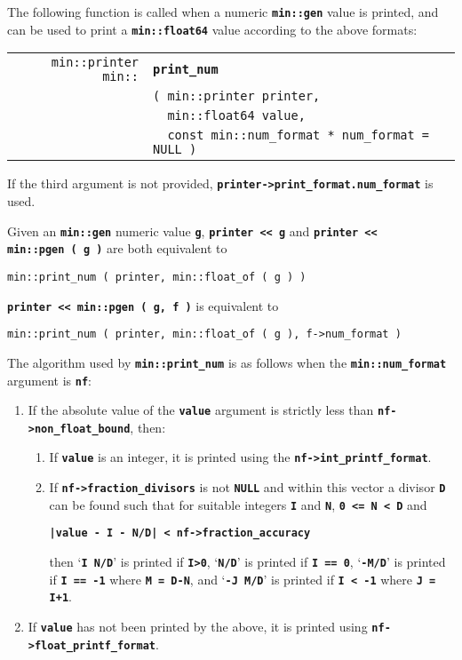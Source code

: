 \documentclass[12pt]{article}
\makeatletter
\newcommand{\TT}[1]{{\tt \bfseries #1}}
\newcommand{\ttindex}[1]{\index{#1@{\tt #1}}}
\newcommand{\EOL}{\penalty \exhyphenpenalty}
\newenvironment{indpar}[1][0.3in]%
	{\begin{list}{}%
		     {\setlength{\itemsep}{0in}%
		      \setlength{\topsep}{0in}%
		      \setlength{\parsep}{1ex}%
		      \setlength{\labelwidth}{#1}%
		      \setlength{\leftmargin}{#1}%
		      \addtolength{\leftmargin}{\labelsep}}%
	 \item}%
	{\end{list}}
\newcommand{\LABEL}[1]{\label{#1}}
\newlength{\ARGBREAKLENGTH}
\newcommand{\ARGBREAK}[1][\ARGBREAKLENGTH]{\\&\hspace*{#1}}
\newcommand{\MINKEY}[1]%
	   {\TT{#1}\ttindex{min::#1}\ttindex{#1}}
\makeatother
\begin{document}
The following function is called when a numeric \TT{min::gen} value
is printed, and can be used to print a \TT{min::\EOL float64}
value according to the above formats:

\begin{indpar}[1em]\begin{tabular}{r@{}l}
\verb|min::printer min::| & \MINKEY{print\_num}\ARGBREAK
    \verb|( min::printer printer,|\ARGBREAK
    \verb|  min::float64 value,|\ARGBREAK
    \verb|  const min::num_format * num_format = NULL )|
\LABEL{MIN::PRINT_NUM} \\
\end{tabular}\end{indpar}

If the third argument is not provided,
\TT{printer->\EOL print\_\EOL format.num\_\EOL format} is used.

Given an \TT{min::gen} numeric value \TT{g}, \TT{printer <{}< g}
and \TT{printer <{}< min::\EOL pgen~(~g~)} are both
equivalent to
\begin{center}
\verb|min::print_num ( printer, min::float_of ( g ) )|
\end{center}

\TT{printer <{}< min::\EOL pgen~(~g,~f~)} is equivalent to
\begin{center}
\verb|min::print_num ( printer, min::float_of ( g ), f->num_format )| \\
\end{center}

The algorithm used by \TT{min::print\_num} is as follows when the
\TT{min::\EOL num\_\EOL format} argument is \TT{nf}:

\begin{enumerate}
\item If the absolute value of the \TT{value} argument is strictly
less than \TT{nf->\EOL non\_\EOL float\_\EOL bound}, then:
\begin{enumerate}
\item If \TT{value} is an integer, it is printed using the
\TT{nf->\EOL int\_\EOL printf\_\EOL format}.
\item If \TT{nf->fraction\_divisors} is not \TT{NULL} and within
this vector a divisor \TT{D} can be found such that for suitable integers
\TT{I} and \TT{N}, \TT{0 <= N < D} and
\begin{center}
\TT{|value - I - N/D| < nf->fraction\_accuracy}
\end{center}
then `\TT{I N/D}' is printed if \TT{I>0}, `\TT{N/D}' is printed if \TT{I == 0},
`\TT{-M/D}' is printed if \TT{I == -1} where \TT{M = D-N}, and
`\TT{-J M/D}' is printed if \TT{I < -1} where \TT{J = I+1}.
\end{enumerate}
\item If \TT{value} has not been printed by the above, it is printed
using \TT{nf->\EOL float\_\EOL printf\_\EOL format}.
\end{enumerate}
\end{document}

